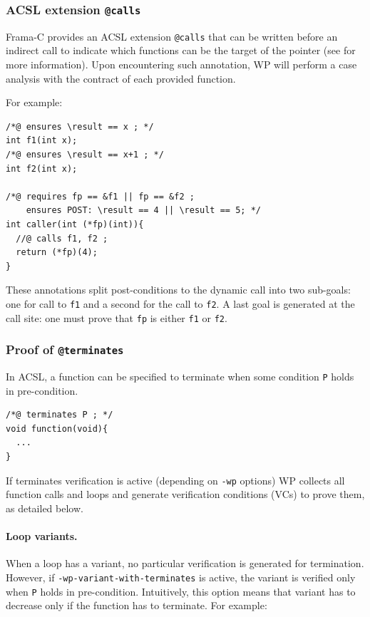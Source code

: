 \subsubsection{ACSL extension \texttt{@calls}}
\label{acsl:calls}

Frama-C provides an ACSL extension \texttt{@calls} that can be written
before an indirect call to indicate which functions can be the target
of the pointer (see \cite{userman} for more information). Upon encountering
such annotation, WP will perform a case analysis with the contract of
each provided function.

For example:

\begin{lstlisting}[style=c]
/*@ ensures \result == x ; */
int f1(int x);
/*@ ensures \result == x+1 ; */
int f2(int x);

/*@ requires fp == &f1 || fp == &f2 ;
    ensures POST: \result == 4 || \result == 5; */
int caller(int (*fp)(int)){
  //@ calls f1, f2 ;
  return (*fp)(4);
}
\end{lstlisting}

These annotations split post-conditions to the dynamic call into two sub-goals: one for call to \verb+f1+ and
a second for the call to \verb+f2+. A last goal is generated at the call
site: one must prove that \verb+fp+ is either \verb+f1+ or \verb+f2+.

\subsubsection{Proof of \texttt{@terminates}}
\label{ss-sec:plugin-terminates}

In ACSL, a function can be specified to terminate when some condition \verb+P+ holds
in pre-condition.

\begin{lstlisting}[style=c]
/*@ terminates P ; */
void function(void){
  ...
}
\end{lstlisting}

If terminates verification is active (depending on \verb+-wp+ options) WP collects all function calls and loops
and generate verification conditions (VCs) to prove them, as detailed below.

\paragraph{Loop variants.} When a loop has a variant, no particular verification
is generated for termination. However, if \verb+-wp-variant-with-terminates+ is
active, the variant is verified only when \verb+P+ holds in pre-condition.
Intuitively, this option means that variant has to decrease only if the function has to terminate. For example:

